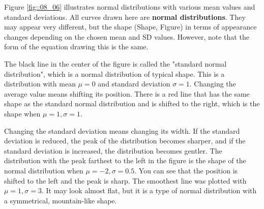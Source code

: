 \documentclass{ltjbook}
\begin{document}
Figure \ref{fig::08_06} illustrates normal distributions with various mean values and standard deviations. All curves drawn here are \textbf{normal distributions}. They may appear very different, but the shape (Shape, Figure) in terms of appearance changes depending on the chosen mean and SD values. However, note that the form of the equation drawing this is the same.

The black line in the center of the figure is called the "standard normal distribution", which is a normal distribution of typical shape. This is a distribution with mean $\mu=0$ and standard deviation $\sigma=1$.
Changing the average value means shifting its position. There is a red line that has the same shape as the standard normal distribution and is shifted to the right, which is the shape when $\mu=1,\sigma=1$.

Changing the standard deviation means changing its width. If the standard deviation is reduced, the peak of the distribution becomes sharper, and if the standard deviation is increased, the distribution becomes gentler.
The distribution with the peak farthest to the left in the figure is the shape of the normal distribution when $\mu=-2, \sigma=0.5$. You can see that the position is shifted to the left and the peak is sharp.
The smoothest line was plotted with $\mu=1, \sigma=3$. It may look almost flat, but it is a type of normal distribution with a symmetrical, mountain-like shape.

\end{document}
